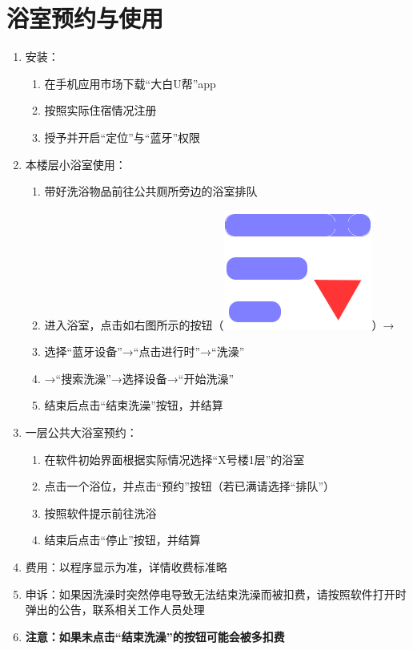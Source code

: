 \section[浴室预约与使用]{浴室预约与使用}
\label{wash_software}
\begin{enumerate}
    \item 安装：
          \begin{enumerate}
              \item 在手机应用市场下载“大白U帮”app
              \item 按照实际住宿情况注册
              \item 授予并开启“定位”与“蓝牙”权限
          \end{enumerate}
    \item 本楼层小浴室使用：
          \begin{enumerate}
              \item 带好洗浴物品前往公共厕所旁边的浴室排队
              \item 进入浴室，点击如右图所示的按钮（\mbox{\includegraphics[height=2.4ex]{bath.png}}）→
              \item 选择“蓝牙设备”→“点击进行时”→“洗澡”
              \item →“搜索洗澡”\footnotemark →选择设备\footnotemark →“开始洗澡”
              \item 结束后点击“结束洗澡”按钮，并结算
          \end{enumerate}
    \item 一层公共大浴室预约：
          \begin{enumerate}
              \item 在软件初始界面根据实际情况选择“X号楼1层”的浴室
              \item 点击一个浴位，并点击“预约”按钮（若已满请选择“排队”）
              \item 按照软件提示前往洗浴
              \item 结束后点击“停止”按钮，并结算
          \end{enumerate}
    \item 费用：以程序显示为准，详情收费标准略
    \item 申诉：如果因洗澡时突然停电导致无法结束洗澡而被扣费，请按照软件打开时弹出的公告，联系相关工作人员处理
    \item \textbf{注意：如果未点击“结束洗澡”的按钮可能会被多扣费}
\end{enumerate}


